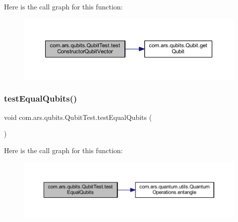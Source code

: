 Here is the call graph for this function\+:\nopagebreak
\begin{figure}[H]
\begin{center}
\leavevmode
\includegraphics[width=350pt]{classcom_1_1ars_1_1qubits_1_1_qubit_test_a47f5f10c10403984398612a0ea940099_cgraph}
\end{center}
\end{figure}
\hypertarget{classcom_1_1ars_1_1qubits_1_1_qubit_test_a260e01e74869bf75442e06872921b91c}{}\label{classcom_1_1ars_1_1qubits_1_1_qubit_test_a260e01e74869bf75442e06872921b91c} 
\subsubsection{\texorpdfstring{test\+Equal\+Qubits()}{testEqualQubits()}}
{\footnotesize\ttfamily void com.\+ars.\+qubits.\+Qubit\+Test.\+test\+Equal\+Qubits (\begin{DoxyParamCaption}{ }\end{DoxyParamCaption})}

Here is the call graph for this function\+:\nopagebreak
\begin{figure}[H]
\begin{center}
\leavevmode
\includegraphics[width=350pt]{classcom_1_1ars_1_1qubits_1_1_qubit_test_a260e01e74869bf75442e06872921b91c_cgraph}
\end{center}
\end{figure}
\hypertarget{classcom_1_1ars_1_1qubits_1_1_qubit_test_abd3fa46c0aaee3c5c2e617d61e3f8d30}{}\label{classcom_1_1ars_1_1qubits_1_1_qubit_test_abd3fa46c0aaee3c5c2e617d61e3f8d30} 
